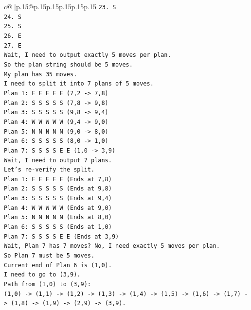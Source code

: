 \documentclass{article}
\begin{document}
{\begin{supertabular}{c@{$\;$}|p{.15\linewidth}@{}p{.15\linewidth}p{.15\linewidth}p{.15\linewidth}p{.15\linewidth}p{.15\linewidth}}
{{{\texttt{23. S} \\
\texttt{24. S} \\
\texttt{25. S} \\
\texttt{26. E} \\
\texttt{27. E} \\
\texttt{Wait, I need to output exactly 5 moves per plan.} \\
\texttt{So the plan string should be 5 moves.} \\
\texttt{My plan has 35 moves.} \\
\texttt{I need to split it into 7 plans of 5 moves.} \\
\texttt{Plan 1: E E E E E (7,2 {-}> 7,8)} \\
\texttt{Plan 2: S S S S S (7,8 {-}> 9,8)} \\
\texttt{Plan 3: S S S S S (9,8 {-}> 9,4)} \\
\texttt{Plan 4: W W W W W (9,4 {-}> 9,0)} \\
\texttt{Plan 5: N N N N N (9,0 {-}> 8,0)} \\
\texttt{Plan 6: S S S S S (8,0 {-}> 1,0)} \\
\texttt{Plan 7: S S S S E E (1,0 {-}> 3,9)} \\
\texttt{Wait, I need to output 7 plans.} \\
\texttt{Let's re{-}verify the split.} \\
\texttt{Plan 1: E E E E E (Ends at 7,8)} \\
\texttt{Plan 2: S S S S S (Ends at 9,8)} \\
\texttt{Plan 3: S S S S S (Ends at 9,4)} \\
\texttt{Plan 4: W W W W W (Ends at 9,0)} \\
\texttt{Plan 5: N N N N N (Ends at 8,0)} \\
\texttt{Plan 6: S S S S S (Ends at 1,0)} \\
\texttt{Plan 7: S S S S E E (Ends at 3,9)} \\
\texttt{Wait, Plan 7 has 7 moves? No, I need exactly 5 moves per plan.} \\
\texttt{So Plan 7 must be 5 moves.} \\
\texttt{Current end of Plan 6 is (1,0).} \\
\texttt{I need to go to (3,9).} \\
\texttt{Path from (1,0) to (3,9):} \\
\texttt{(1,0) {-}> (1,1) {-}> (1,2) {-}> (1,3) {-}> (1,4) {-}> (1,5) {-}> (1,6) {-}> (1,7) {-}> (1,8) {-}> (1,9) {-}> (2,9) {-}> (3,9).} \\
}}}
\end{supertabular}}
\end{document}

